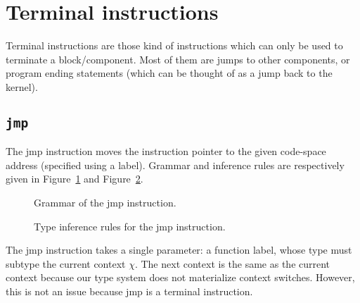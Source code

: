 \section{Terminal instructions}\label{sec:nstar-instructionset-terminal}

Terminal instructions are those kind of instructions which can only be used to terminate a block/component.
Most of them are jumps to other components, or program ending statements (which can be thought of as a jump back to the kernel).

\subsection{\texttt{jmp}}\label{subsec:nstar-instructionset-teminal-jmp}

The {\Iformat jmp} instruction moves the instruction pointer to the given code-space address (specified using a label).
Grammar and inference rules are respectively given in Figure~\ref{fig:nstar-instructionset-terminal-jmp-grammar} and Figure~\ref{fig:nstar-instructionset-terminal-jmp-typerules}.

\begin{figure}[H]
	\centering


	\caption{Grammar of the {\Iformat jmp} instruction.}
	\label{fig:nstar-instructionset-terminal-jmp-grammar}
\end{figure}

\begin{figure}[H]
	\centering


	\caption{Type inference rules for the {\Iformat jmp} instruction.}
	\label{fig:nstar-instructionset-terminal-jmp-typerules}
\end{figure}

The {\Iformat jmp} instruction takes a single parameter: a function label, whose type must subtype the current context $\chi$.
The next context is the same as the current context because our type system does not materialize context switches.
However, this is not an issue because {\Iformat jmp} is a terminal instruction.

